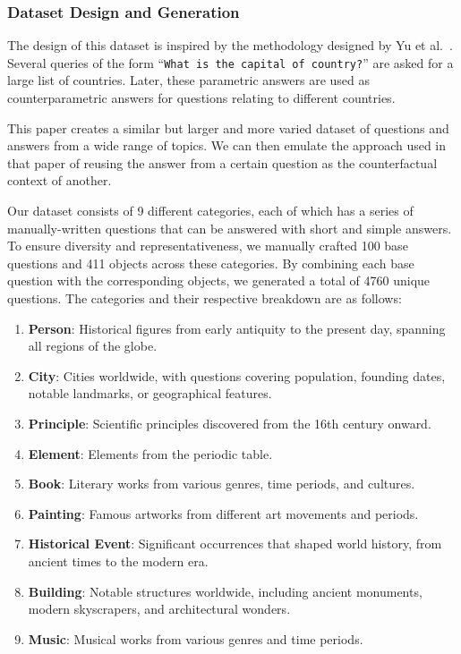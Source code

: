 \subsubsection{Dataset Design and Generation}

The design of this dataset is inspired by the methodology designed by Yu et al.~\cite{factual_recall}.
Several queries of the form ``\texttt{What is the capital of {country}?}'' are asked for a large list of countries.
Later, these parametric answers are used as counterparametric answers for questions relating to different countries.

This paper creates a similar but larger and more varied dataset of questions and answers from a wide range of topics.
We can then emulate the approach used in that paper of reusing the answer from a certain question as the counterfactual context of another.

Our dataset consists of 9 different categories, each of which has a series of manually-written questions that can be answered with short and simple answers.
To ensure diversity and representativeness, we manually crafted 100 base questions and 411 objects across these categories.
By combining each base question with the corresponding objects, we generated a total of 4760 unique questions.
The categories and their respective breakdown are as follows:

\begin{enumerate}
	\item \textbf{Person}: Historical figures from early antiquity to the present day, spanning all regions of the globe.
	\item \textbf{City}: Cities worldwide, with questions covering population, founding dates, notable landmarks, or geographical features.
	\item \textbf{Principle}: Scientific principles discovered from the 16th century onward.
	\item \textbf{Element}: Elements from the periodic table.
	\item \textbf{Book}: Literary works from various genres, time periods, and cultures.
	\item \textbf{Painting}: Famous artworks from different art movements and periods.
	\item \textbf{Historical Event}: Significant occurrences that shaped world history, from ancient times to the modern era.
	\item \textbf{Building}: Notable structures worldwide, including ancient monuments, modern skyscrapers, and architectural wonders.
	\item \textbf{Music}: Musical works from various genres and time periods.
\end{enumerate}

